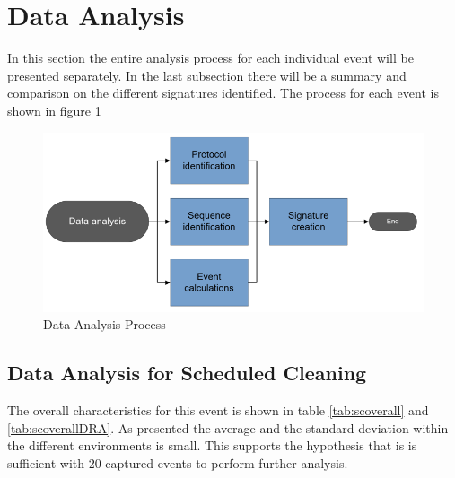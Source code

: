 \section{Data Analysis}
In this section the entire analysis process for each individual event will be presented separately. In the last subsection there will be a summary and comparison on the different signatures identified. The process for each event is shown in figure \ref{fig:dataanalysisprocess}

\begin{figure}[H]
    \centering
    \includegraphics[width=\textwidth]{figures/data-analysis-process.png}
    \caption{Data Analysis Process}
    \label{fig:dataanalysisprocess}
\end{figure}



\subsection{Data Analysis for Scheduled Cleaning}
The overall characteristics for this event is shown in table \ref{tab:scoverall} and \ref{tab:scoverallDRA}. As presented the average and the standard deviation within the different environments is small. This supports the hypothesis that is is sufficient with 20 captured events to perform further analysis.


